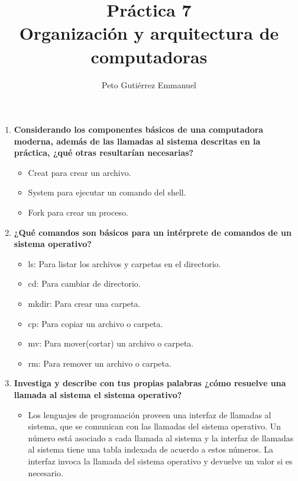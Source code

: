 \documentclass{article}
\title{Práctica 7 \\ Organización y arquitectura de computadoras}
\author{Peto Gutiérrez Emmanuel}
\begin{document}
\maketitle
\begin{enumerate}[1.]
\item \textbf{Considerando los componentes básicos de una computadora moderna, además de las llamadas al sistema descritas en la práctica, ¿qué otras resultarían necesarias?}
	\begin{itemize}
	\item Creat para crear un archivo.
	\item System para ejecutar un comando del shell.
	\item Fork para crear un proceso.
	\end{itemize}
\item \textbf{¿Qué comandos son básicos para un intérprete de comandos de un sistema operativo?}
	\begin{itemize}
	\item ls: Para listar los archivos y carpetas en el directorio.
	\item cd: Para cambiar de directorio.
	\item mkdir: Para crear una carpeta.
	\item cp: Para copiar un archivo o carpeta.
	\item mv: Para mover(cortar) un archivo o carpeta.
	\item rm: Para remover un archivo o carpeta.
	\end{itemize}
\item \textbf{Investiga y describe con tus propias palabras ¿cómo resuelve una llamada al sistema el sistema operativo?}
	\begin{itemize}
	\item Los lenguajes de programación proveen una interfaz de llamadas al sistema, que se comunican con las llamadas del sistema operativo. Un número está asociado a cada llamada al sistema y la interfaz de llamadas al sistema tiene una tabla indexada de acuerdo a estos números. La interfaz invoca la llamada del sistema operativo y devuelve un valor si es necesario.
	\end{itemize}
\end{enumerate}
\end{document}
